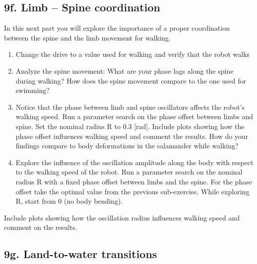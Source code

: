 \documentclass{cmc}
\begin{document}
\subsection*{9f. Limb – Spine coordination}
\label{sec:limb-spine-coordination}

In this next part you will explore the importance of a proper coordination
between the spine and the limb movement for walking.

\begin{enumerate}
\item Change the drive to a value used for walking and verify that the robot
  walks
\item Analyze the spine movement: What are your phase lags along the spine
  during walking? How does the spine movement compare to the one used for
  swimming?
\item Notice that the phase between limb and spine oscillators affects the
  robot’s walking speed. Run a parameter search on the phase offset between
  limbs and spine. Set the nominal radius R to 0.3 [rad]. Include plots showing
  how the phase offset influences walking speed and comment the results. How do
  your findings compare to body deformations in the salamander while walking?
\item Explore the influence of the oscillation amplitude along the body with
  respect to the walking speed of the robot. Run a parameter search on the
  nominal radius R with a fixed phase offset between limbs and the spine. For
  the phase offset take the optimal value from the previous sub-exercise. While
  exploring R, start from 0 (no body bending).
\end{enumerate}

Include plots showing how the oscillation radius influences walking speed and
comment on the results.



\subsection*{9g. Land-to-water transitions}
\end{document}

